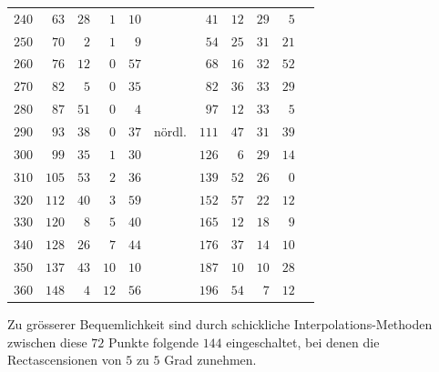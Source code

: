 \begin{center}
\begin{tabular}{r||rr|rrl||rr|rrl}
$240$&$63$&$28$&$1$&$10$&&$41$&$12$&$29$&$5$&\\
$250$&$70$&$2$&$1$&$9$&&$54$&$25$&$31$&$21$&\\
$260$&$76$&$12$&$0$&$57$&&$68$&$16$&$32$&$52$&\\
$270$&$82$&$5$&$0$&$35$&&$82$&$36$&$33$&$29$&\\
$280$&$87$&$51$&$0$&$4$&&$97$&$12$&$33$&$5$&\\
$290$&$93$&$38$&$0$&$37$&nördl.&$111$&$47$&$31$&$39$&\\
$300$&$99$&$35$&$1$&$30$&&$126$&$6$&$29$&$14$&\\
$310$&$105$&$53$&$2$&$36$&&$139$&$52$&$26$&$0$&\\
$320$&$112$&$40$&$3$&$59$&&$152$&$57$&$22$&$12$&\\
$330$&$120$&$8$&$5$&$40$&&$165$&$12$&$18$&$9$&\\
$340$&$128$&$26$&$7$&$44$&&$176$&$37$&$14$&$10$&\\
$350$&$137$&$43$&$10$&$10$&&$187$&$10$&$10$&$28$&\\
$360$&$148$&$4$&$12$&$56$&&$196$&$54$&$7$&$12$&
\end{tabular}
\endgroup
\end{center}
%
Zu grösserer Bequemlichkeit sind durch schickliche Interpolations-Methoden
zwischen diese $72$ Punkte folgende $144$ eingeschaltet, bei denen die Rectascensionen
von $5$ zu $5$ Grad zunehmen.

